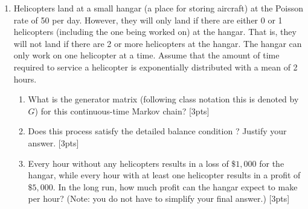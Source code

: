 \documentclass[12pt]{article}
\newcommand{\bpi}{{\mathbf \pi}}
\begin{document}
\begin{enumerate}
\item Helicopters land at a small hangar (a place for storing
  aircraft) at the Poisson rate of 50 per day.  However, they will
  only land if there are either 0 or 1 helicopters (including the one
  being worked on) at the hangar. That is, they will not land if there
  are 2 or more helicopters at the hangar. The hangar can only work on
  one helicopter at a time. Assume that the amount of time required to
  service a helicopter is exponentially distributed with a mean of 2
  hours.
\begin{enumerate}
\item What is the generator matrix (following class notation this is denoted by $G$) for this continuous-time Markov chain? [3pts]
\item Does this process satisfy the detailed balance condition ? Justify your answer. [3pts]
\item Every hour without any helicopters results in a loss of
  $\$1,000$ for the hangar, while every hour with at least one
  helicopter results in a profit of $\$5,000$. In the long run, how
  much profit can the hangar expect to make per hour? (Note: you do not have to simplify your final answer.) [3pts]
\end{enumerate}



\end{enumerate}
\end{document}
